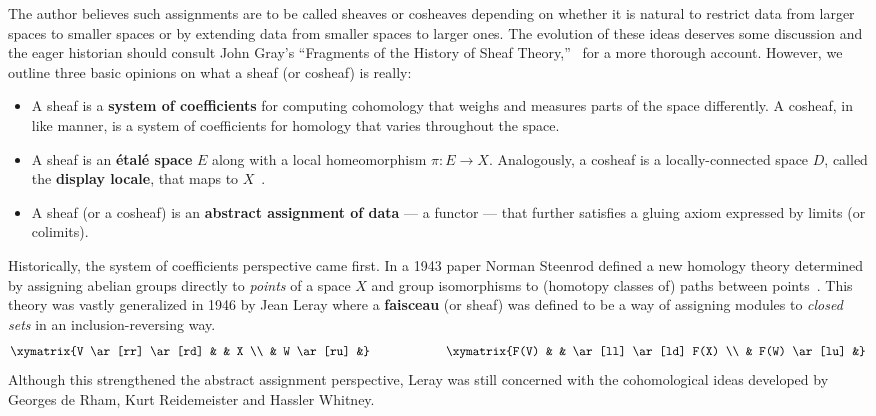 The author believes such assignments are to be called sheaves or cosheaves depending on whether it is natural to restrict data from larger spaces to smaller spaces or by extending data from smaller spaces to larger ones. The evolution of these ideas deserves some discussion and the eager historian should consult John Gray's ``Fragments of the History of Sheaf Theory,''~\cite{gray} for a more thorough account. However, we outline three basic opinions on what a sheaf (or cosheaf) is really:
\begin{itemize}
	\item A sheaf is a \textbf{system of coefficients} for computing cohomology that weighs and measures parts of the space differently. A cosheaf, in like manner, is a system of coefficients for homology that varies throughout the space.
	\item A sheaf is an \textbf{\'etal\'e space} $E$ along with a local homeomorphism $\pi:E\to X$. Analogously, a cosheaf is a locally-connected space $D$, called the \textbf{display locale}, that maps to $X$~\cite{funk-display}.
	\item A sheaf (or a cosheaf) is an \textbf{abstract assignment of data} --- a functor --- that further satisfies a gluing axiom expressed by limits (or colimits).
\end{itemize}

Historically, the system of coefficients perspective came first. In a 1943 paper Norman Steenrod defined a new homology theory determined by assigning abelian groups directly to \emph{points} of a space $X$ and group isomorphisms to (homotopy classes of) paths between points~\cite{steenrod}. This theory was vastly generalized in 1946 by Jean Leray where a \textbf{faisceau} (or sheaf) was defined to be a way of assigning modules to \emph{closed sets} in an inclusion-reversing way.
\[
	\xymatrix{V \ar[rr] \ar[rd] & & X \\ & W \ar[ru] &} \qquad \qquad \qquad \xymatrix{F(V) & & \ar[ll] \ar[ld] F(X) \\ & F(W) \ar[lu] &}
\]
Although this strengthened the abstract assignment perspective, Leray was still concerned with the cohomological ideas developed by Georges de Rham, Kurt Reidemeister and Hassler Whitney. 

